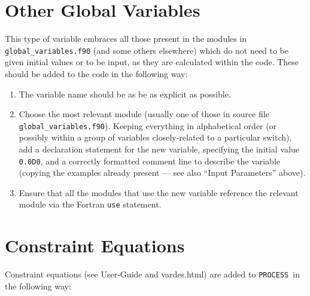 \documentclass[11pt,a4paper]{report}
\newcommand{\process}{\mbox{\texttt{PROCESS}}}
\begin{document}
\section{Other Global Variables}

This type of variable embraces all those present in the modules in
\texttt{global\_variables.f90} (and some others elsewhere) which do not need
to be given initial values or to be input, as they are calculated within the
code. These should be added to the code in the following way:

\begin{enumerate}
\item The variable name should be as be as explicit as possible.

\item Choose the most relevant module (usually one of those in source file
  \texttt{global\_variables.f90}). Keeping everything in alphabetical order
  (or possibly within a group of variables closely-related to a particular
  switch), add a declaration statement for the new variable, specifying the
  initial value \texttt{0.0D0}, and a correctly formatted comment line to
  describe the variable (copying the examples already present --- see also
  ``Input Parameters'' above).

\item Ensure that all the modules that use the new variable reference the
  relevant module via the Fortran \texttt{use} statement.

\end{enumerate}

\section{Constraint Equations}

Constraint equations (see User-Guide and vardes.html) are added to
\process\ in the following way:
\end{document}
